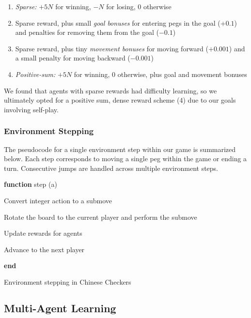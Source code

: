 \documentclass[12pt, a4paper, twocolumn]{article}
\begin{document}
\begin{enumerate}
  \item \textit{Sparse:} $+5N$ for winning, $-N$ for losing, $0$ otherwise
  \item Sparse reward, plus small \textit{goal bonuses} for entering pegs in the goal ($+0.1$) and penalties for removing them from the goal ($-0.1$)
  \item Sparse reward, plus tiny \textit{movement bonuses} for moving forward ($+0.001$) and a small penalty for moving backward ($-0.001$)
  \item \textit{Positive-sum:} $+5N$ for winning, $0$ otherwise, plus goal and movement bonuses
\end{enumerate}

We found that agents with sparse rewards had difficulty learning, so we ultimately opted for a positive sum, dense reward scheme (4) due to our goals involving self-play.

\subsubsection{Environment Stepping}

The pseudocode for a single environment step within our game is summarized below. Each step corresponds to moving a single peg within the game or ending a turn. Consecutive jumps are handled across multiple environment steps.

\begin{algorithm}

  \textbf{function} step (a)
  
  \Indp

  \Input{\textit{a}: Integer action in $[0, (4N + 1) \times (4N + 1) \times 6 \times 2 + 1)$}
  
  Convert integer action to a submove

  Rotate the board to the current player and perform the submove

  Update rewards for agents

    {
      Advance to the next player
    }

  \Indm

  \textbf{end}

  \caption{Environment stepping in Chinese Checkers}
\end{algorithm}
  
\subsection{Multi-Agent Learning}
\end{document}
